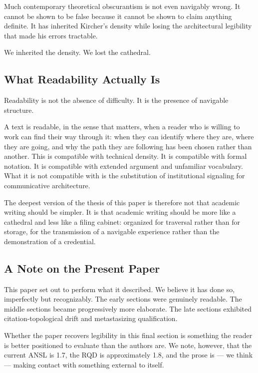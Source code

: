 \documentclass[12pt, a4paper]{article}
\begin{document}
Much contemporary theoretical obscurantism is not even navigably wrong. It cannot be shown to be false because it cannot be shown to claim anything definite. It has inherited Kircher's density while losing the architectural legibility that made his errors tractable.

We inherited the density. We lost the cathedral.

\subsection{What Readability Actually Is}

Readability is not the absence of difficulty. It is the presence of navigable structure.

A text is readable, in the sense that matters, when a reader who is willing to work can find their way through it: when they can identify where they are, where they are going, and why the path they are following has been chosen rather than another. This is compatible with technical density. It is compatible with formal notation. It is compatible with extended argument and unfamiliar vocabulary. What it is not compatible with is the substitution of institutional signaling for communicative architecture.

The deepest version of the thesis of this paper is therefore not that academic writing should be simpler. It is that academic writing should be more like a cathedral and less like a filing cabinet: organized for traversal rather than for storage, for the transmission of a navigable experience rather than the demonstration of a credential.

\subsection{A Note on the Present Paper}

This paper set out to perform what it described. We believe it has done so, imperfectly but recognizably. The early sections were genuinely readable. The middle sections became progressively more elaborate. The late sections exhibited citation-topological drift and metastasizing qualification.

Whether the paper recovers legibility in this final section is something the reader is better positioned to evaluate than the authors are. We note, however, that the current ANSL is 1.7, the RQD is approximately 1.8, and the prose is --- we think --- making contact with something external to itself.
\end{document}
